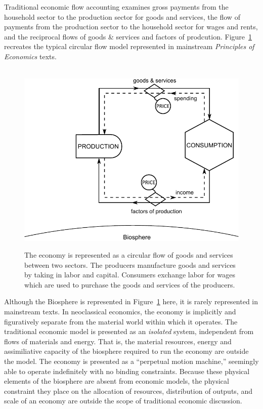 Traditional economic flow accounting examines gross payments 
from the household sector to the production sector for goods and services, the flow of payments from the production sector 
to the household sector for wages and rents, and the reciprocal flows of goods \& services and factors of prodcution. Figure~\ref{fig:perp_motion_1} 
recreates the typical circular flow model represented in mainstream \emph{Principles of Economics} texts.

\begin{figure}[!ht]
\label{fig:perp_motion_1}
\centering\
\includegraphics[width=\linewidth]{Part_0/Chapter_Introduction/images/Perpetual_motion_1.pdf}
\caption[The traditional economic model of the economy]{The economy 
is represented as a circular flow of goods and services between two sectors. 
The producers manufacture goods and services 
by taking in labor and capital. 
Consumers exchange labor for wages 
which are used to purchase 
the goods and services of the producers.}
\end{figure}

Although the Biosphere is represented in
Figure~\ref{fig:perp_motion_1} 
here, it is rarely represented in mainstream texts. 
In neoclassical economics, 
the economy is implicitly and figuratively separate from the material world within which it operates.
The traditional economic model is presented as an \emph{isolated} system, 
independent from flows of materials and energy.
That is, the material resources, energy
and assimiliative capacity of the biosphere required to run the economy are outside the model.
The economy is presented as a ``perpetual motion machine,'' seemingly able to %
operate indefinitely with no binding constraints.
Because these physical elements of the biosphere are absent from economic models,
the physical constraint they place on the allocation of resources, distribution of outputs, and 
scale of an economy are outside the scope of traditional economic discussion.


